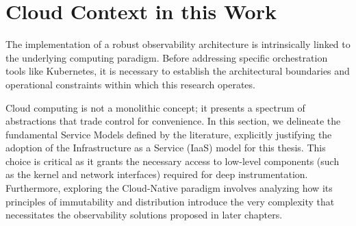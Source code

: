 \section{Cloud Context in this Work}
\label{sec:cloud-context}

The implementation of a robust observability architecture is intrinsically linked to the underlying computing paradigm. Before addressing specific orchestration tools like Kubernetes, it is necessary to establish the architectural boundaries and operational constraints within which this research operates.

Cloud computing is not a monolithic concept; it presents a spectrum of abstractions that trade control for convenience. In this section, we delineate the fundamental Service Models defined by the literature, explicitly justifying the adoption of the Infrastructure as a Service (IaaS) model for this thesis. This choice is critical as it grants the necessary access to low-level components (such as the kernel and network interfaces) required for deep instrumentation. Furthermore, exploring the Cloud-Native paradigm involves analyzing how its principles of immutability and distribution introduce the very complexity that necessitates the observability solutions proposed in later chapters.







